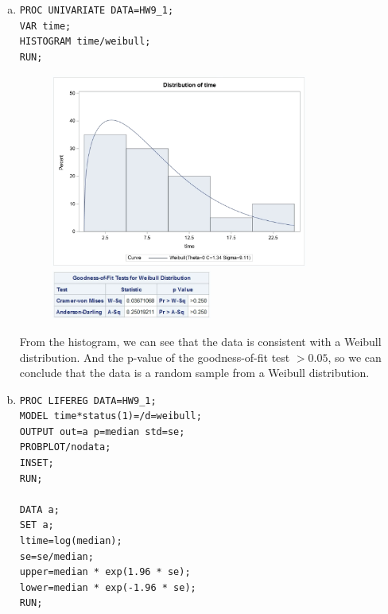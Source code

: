 \documentclass{elegantbook}
\begin{document}
\begin{solution}
    \begin{enumerate}[(a)]
        \item \begin{verbatim}
PROC UNIVARIATE DATA=HW9_1;
VAR time;
HISTOGRAM time/weibull;
RUN;
        \end{verbatim}
        \begin{figure}[H]
            \centering
            \includegraphics[width=0.8\textwidth]{HW9_2a.png}
            \includegraphics[width=0.5\textwidth]{HW9_2a1.png}
        \end{figure}
        From the histogram, we can see that the data is consistent with a Weibull distribution. And the p-value of the goodness-of-fit test $>0.05$, so we can conclude that the data is a random sample from a Weibull distribution. 
        \item \begin{verbatim}
PROC LIFEREG DATA=HW9_1;
MODEL time*status(1)=/d=weibull;
OUTPUT out=a p=median std=se;
PROBPLOT/nodata;
INSET;
RUN;

DATA a;
SET a;
ltime=log(median);
se=se/median;
upper=median * exp(1.96 * se);
lower=median * exp(-1.96 * se);
RUN;


\end{verbatim}
\end{enumerate}
\end{solution}
\end{document}
